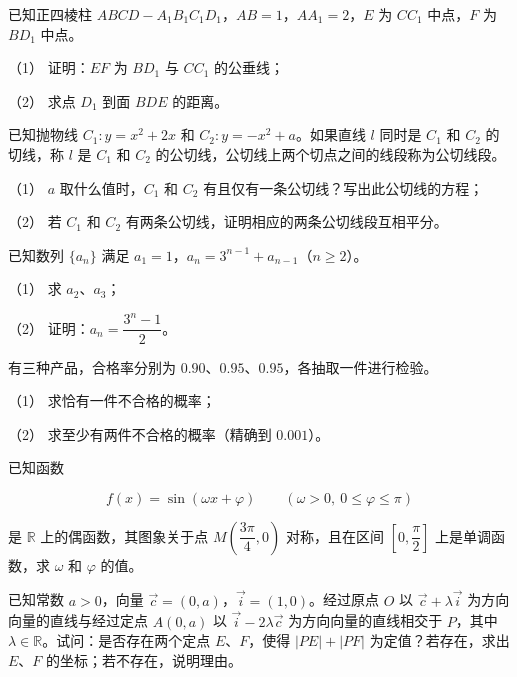 \Needspace{0.4\textheight}
\begin{question}
已知正四棱柱 $ABCD-A_1B_1C_1D_1$，$AB=1$，$AA_1=2$，$E$ 为 $CC_1$ 中点，$F$ 为 $BD_1$ 中点。
\nopagebreak[4]
\begin{center}\end{center}
\nopagebreak[4]
（1） 证明：$EF$ 为 $BD_1$ 与 $CC_1$ 的公垂线；

（2） 求点 $D_1$ 到面 $BDE$ 的距离。

\end{question}
\begin{question}
已知抛物线 $C_1:y=x^2+2x$ 和 $C_2:y=-x^2+a$。如果直线 $l$ 同时是 $C_1$ 和 $C_2$ 的切线，称 $l$ 是 $C_1$ 和 $C_2$ 的公切线，公切线上两个切点之间的线段称为公切线段。

（1） $a$ 取什么值时，$C_1$ 和 $C_2$ 有且仅有一条公切线？写出此公切线的方程；

（2） 若 $C_1$ 和 $C_2$ 有两条公切线，证明相应的两条公切线段互相平分。

\end{question}
\begin{question}
已知数列 $\{a_n\}$ 满足 $a_1=1$，$a_n=3^{n-1}+a_{n-1}$（$n\geqslant2$）。

（1） 求 $a_2\text{、}a_3$；

（2） 证明：$a_n=\dfrac{3^n-1}{2}$。

\end{question}
\begin{question}
有三种产品，合格率分别为 $0.90\text{、}0.95\text{、}0.95$，各抽取一件进行检验。

（1） 求恰有一件不合格的概率；

（2） 求至少有两件不合格的概率（精确到 $0.001$）。

\Needspace{0.4\textheight}
\end{question}
\begin{question}
已知函数

\nopagebreak[4]
\[
f(x)=\sin(\omega x+\varphi)\qquad(\omega>0,\ 0\leqslant\varphi\leqslant\pi)
\]

是 $\mathbb R$ 上的偶函数，其图象关于点 $M\left(\dfrac{3\pi}{4},0\right)$ 对称，且在区间 $\left[0,\dfrac\pi2\right]$ 上是单调函数，求 $\omega$ 和 $\varphi$ 的值。
\nopagebreak[4]
\begin{center}\end{center}
\nopagebreak[4]
\end{question}
\begin{question}
已知常数 $a>0$，向量 $\vec c=(0,a)$，$\vec i=(1,0)$。经过原点 $O$ 以 $\vec c+\lambda\vec i$ 为方向向量的直线与经过定点 $A(0,a)$ 以 $\vec i-2\lambda\vec c$ 为方向向量的直线相交于 $P$，其中 $\lambda\in\mathbb R$。试问：是否存在两个定点 $E\text{、}F$，使得 $|PE|+|PF|$ 为定值？若存在，求出 $E\text{、}F$ 的坐标；若不存在，说明理由。

\end{question}
